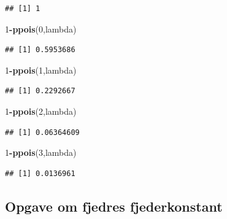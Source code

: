 \documentclass[
]{article}
\newenvironment{Shaded}{\begin{snugshade}}{\end{snugshade}}
\newcommand{\DecValTok}[1]{\textcolor[rgb]{0.00,0.00,0.81}{#1}}
\newcommand{\FunctionTok}[1]{\textcolor[rgb]{0.13,0.29,0.53}{\textbf{#1}}}
\newcommand{\NormalTok}[1]{#1}
\newcommand{\SpecialCharTok}[1]{\textcolor[rgb]{0.81,0.36,0.00}{\textbf{#1}}}
\begin{document}
\begin{verbatim}
## [1] 1
\end{verbatim}

\begin{Shaded}
\begin{Highlighting}[]
\DecValTok{1}\SpecialCharTok{{-}}\FunctionTok{ppois}\NormalTok{(}\DecValTok{0}\NormalTok{,lambda)}
\end{Highlighting}
\end{Shaded}

\begin{verbatim}
## [1] 0.5953686
\end{verbatim}

\begin{Shaded}
\begin{Highlighting}[]
\DecValTok{1}\SpecialCharTok{{-}}\FunctionTok{ppois}\NormalTok{(}\DecValTok{1}\NormalTok{,lambda)}
\end{Highlighting}
\end{Shaded}

\begin{verbatim}
## [1] 0.2292667
\end{verbatim}

\begin{Shaded}
\begin{Highlighting}[]
\DecValTok{1}\SpecialCharTok{{-}}\FunctionTok{ppois}\NormalTok{(}\DecValTok{2}\NormalTok{,lambda)}
\end{Highlighting}
\end{Shaded}

\begin{verbatim}
## [1] 0.06364609
\end{verbatim}

\begin{Shaded}
\begin{Highlighting}[]
\DecValTok{1}\SpecialCharTok{{-}}\FunctionTok{ppois}\NormalTok{(}\DecValTok{3}\NormalTok{,lambda)}
\end{Highlighting}
\end{Shaded}

\begin{verbatim}
## [1] 0.0136961
\end{verbatim}

\subsection{Opgave om fjedres
fjederkonstant}\label{opgave-om-fjedres-fjederkonstant}
\end{document}
